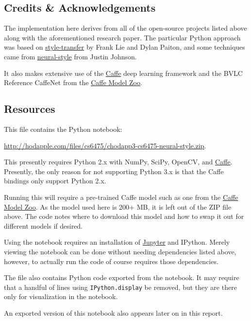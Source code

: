 \documentclass{article}
\begin{document}
\subsection{Credits \& Acknowledgements}

The implementation here derives from all of the open-source projects
listed above along with the aforementioned research
paper\cite{neuralstyle2015}.  The particular Python approach was based
on \href{https://github.com/fzliu/style-transfer}{style-transfer} by
Frank Lie and Dylan Paiton, and some techniques came from
\href{https://github.com/jcjohnson/neural-style}{neural-style} from
Justin Johnson.

It also makes extensive use of the
\href{http://caffe.berkeleyvision.org/}{Caffe} deep learning framework
and the BVLC Reference CaffeNet from the
\href{http://caffe.berkeleyvision.org/model_zoo.html}{Caffe Model
  Zoo}.

\subsection{Resources}

This file contains the Python notebook:

\url{http://hodapple.com/files/cs6475/chodapp3-cs6475-neural-style.zip}.

This presently requires Python 2.x with NumPy, SciPy, OpenCV, and
\href{http://caffe.berkeleyvision.org/}{Caffe}.  Presently, the only
reason for not supporting Python 3.x is that the Caffe bindings only
support Python 2.x.

Running this will require a pre-trained Caffe model such as one from
the \href{http://caffe.berkeleyvision.org/model_zoo.html}{Caffe Model
  Zoo}.  As the model used here is 200+ MB, it is left out of the ZIP
file above.  The code notes where to download this model and how to
swap it out for different models if desired.

Using the notebook requires an installation of
\href{https://jupyter.org/}{Jupyter} and IPython.  Merely viewing the
notebook can be done without needing dependencies listed above,
however, to actually run the code of course requires those
dependencies.

The file also contains Python code exported from the notebook.  It may
require that a handful of lines using \texttt{IPython.display} be
removed, but they are there only for visualization in the notebook.

An exported version of this notebook also appears later on in this
report.
\end{document}
